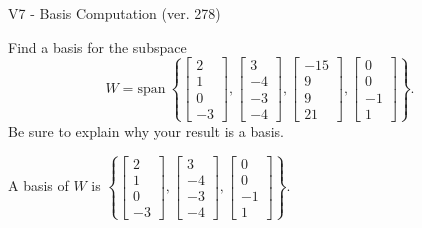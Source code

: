 \begin{exercise}
  \begin{exerciseTitle}V7 - Basis Computation (ver. 278)\end{exerciseTitle}
  \begin{exerciseStatement}
    Find a basis for the subspace 
\[W=\mathrm{span}\ \left\{\left[\begin{array}{r}
2 \\
1 \\
0 \\
-3
\end{array}\right] , \left[\begin{array}{r}
3 \\
-4 \\
-3 \\
-4
\end{array}\right] , \left[\begin{array}{r}
-15 \\
9 \\
9 \\
21
\end{array}\right] , \left[\begin{array}{r}
0 \\
0 \\
-1 \\
1
\end{array}\right]\right\}.\]
 Be sure to explain why your result is a basis.


  \end{exerciseStatement}
  \begin{exerciseAnswer}
   A basis of \(W\) is  \(\left\{\left[\begin{array}{r}
2 \\
1 \\
0 \\
-3
\end{array}\right] , \left[\begin{array}{r}
3 \\
-4 \\
-3 \\
-4
\end{array}\right] , \left[\begin{array}{r}
0 \\
0 \\
-1 \\
1
\end{array}\right]\right\}\).
  


  \end{exerciseAnswer}
\end{exercise}